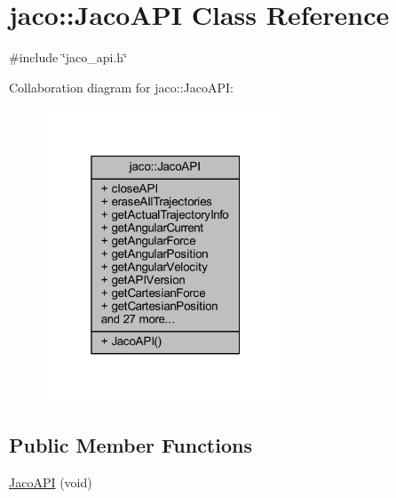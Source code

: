 \hypertarget{classjaco_1_1JacoAPI}{}\section{jaco\+:\+:Jaco\+A\+PI Class Reference}
\label{classjaco_1_1JacoAPI}


{\ttfamily \#include \char`\"{}jaco\+\_\+api.\+h\char`\"{}}



Collaboration diagram for jaco\+:\+:Jaco\+A\+PI\+:
\nopagebreak
\begin{figure}[H]
\begin{center}
\leavevmode
\includegraphics[width=205pt]{dd/d0f/classjaco_1_1JacoAPI__coll__graph}
\end{center}
\end{figure}
\subsection*{Public Member Functions}
\begin{DoxyCompactItemize}
\item 
\hyperlink{classjaco_1_1JacoAPI_ac9bb26a48274e51c96d460f74372ccd0}{Jaco\+A\+PI} (void)
\end{DoxyCompactItemize}
